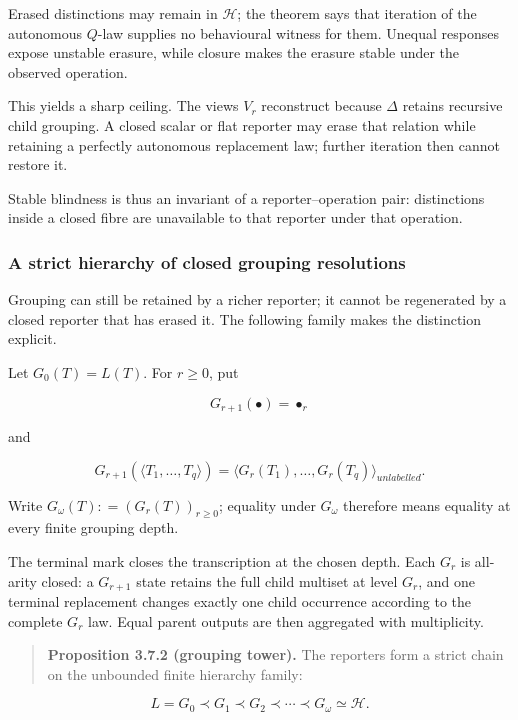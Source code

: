\documentclass[11pt,a4paper]{article}
\begin{document}
Erased distinctions may remain in \(\mathcal{H}\); the theorem says that
iteration of the autonomous \(Q\)-law supplies no behavioural witness
for them. Unequal responses expose unstable erasure, while closure makes
the erasure stable under the observed operation.

This yields a sharp ceiling. The views \(V_{r}\) reconstruct because
\(\Delta\) retains recursive child grouping. A closed scalar or flat
reporter may erase that relation while retaining a perfectly autonomous
replacement law; further iteration then cannot restore it.

Stable blindness is thus an invariant of a reporter--operation pair:
distinctions inside a closed fibre are unavailable to that reporter
under that operation.

\subsubsection{A strict hierarchy of closed grouping
resolutions}

Grouping can still be retained by a richer reporter; it cannot be
regenerated by a closed reporter that has erased it. The following
family makes the distinction explicit.

Let \(G_{0}(T) = L(T)\). For \(r \geq 0\), put

\[G_{r + 1}( \bullet ) = \bullet_{r}\]

and

\[G_{r + 1}\left( \langle T_{1},\ldots,T_{q}\rangle \right) = \langle G_{r}\left( T_{1} \right),\ldots,G_{r}\left( T_{q} \right)\rangle_{unlabelled}.\]

Write \(G_{\omega}(T): = \left( G_{r}(T) \right)_{r \geq 0}\); equality
under \(G_{\omega}\) therefore means equality at every finite grouping
depth.

The terminal mark closes the transcription at the chosen depth. Each
\(G_{r}\) is all-arity closed: a \(G_{r + 1}\) state retains the full
child multiset at level \(G_{r}\), and one terminal replacement changes
exactly one child occurrence according to the complete \(G_{r}\) law.
Equal parent outputs are then aggregated with multiplicity.

\begin{quote}
\textbf{Proposition 3.7.2 (grouping tower).} The reporters form a strict
chain on the unbounded finite hierarchy family:
\end{quote}

\[\boxed{L = G_{0} \prec G_{1} \prec G_{2} \prec \cdots \prec G_{\omega} \simeq \mathcal{H}.}\]
\end{document}
